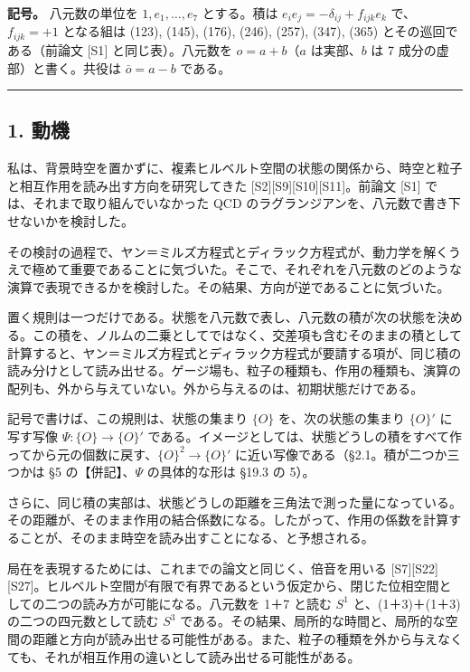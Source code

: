 \documentclass[
  a4paper,
]{ltjsarticle}
\begin{document}
\textbf{記号。} 八元数の単位を \(1, e_1, \dots, e_7\) とする。積は
\(e_ie_j = -\delta_{ij} + f_{ijk}e_k\) で、\(f_{ijk} = +1\) となる組は
(123), (145), (176), (246), (257), (347), (365) とその巡回である（前論文
{[}S1{]} と同じ表）。八元数を \(o = a + b\)（\(a\) は実部、\(b\) は 7
成分の虚部）と書く。共役は \(\bar o = a - b\) である。

\begin{center}\rule{0.5\linewidth}{0.5pt}\end{center}

\subsection{1. 動機}\label{ux52d5ux6a5f}

私は、背景時空を置かずに、複素ヒルベルト空間の状態の関係から、時空と粒子と相互作用を読み出す方向を研究してきた
{[}S2{]}{[}S9{]}{[}S10{]}{[}S11{]}。前論文 {[}S1{]}
では、それまで取り組んでいなかった QCD
のラグランジアンを、八元数で書き下せないかを検討した。

その検討の過程で、ヤン＝ミルズ方程式とディラック方程式が、動力学を解くうえで極めて重要であることに気づいた。そこで、それぞれを八元数のどのような演算で表現できるかを検討した。その結果、方向が逆であることに気づいた。

置く規則は一つだけである。状態を八元数で表し、八元数の積が次の状態を決める。この積を、ノルムの二乗としてではなく、交差項も含むそのままの積として計算すると、ヤン＝ミルズ方程式とディラック方程式が要請する項が、同じ積の読み分けとして読み出せる。ゲージ場も、粒子の種類も、作用の種類も、演算の配列も、外から与えていない。外から与えるのは、初期状態だけである。

記号で書けば、この規則は、状態の集まり \(\{O\}\) を、次の状態の集まり
\(\{O\}'\) に写す写像 \(\Psi : \{O\} \to \{O\}'\)
である。イメージとしては、状態どうしの積をすべて作ってから元の個数に戻す、\(\{O\}^2 \to \{O\}'\)
に近い写像である（§2.1。積が二つか三つかは §5 の【併記】、\(\Psi\)
の具体的な形は §19.3 の 5）。

さらに、同じ積の実部は、状態どうしの距離を三角法で測った量になっている。その距離が、そのまま作用の結合係数になる。したがって、作用の係数を計算することが、そのまま時空を読み出すことになる、と予想される。

局在を表現するためには、これまでの論文と同じく、倍音を用いる
{[}S7{]}{[}S22{]}{[}S27{]}。ヒルベルト空間が有限で有界であるという仮定から、閉じた位相空間としての二つの読み方が可能になる。八元数を
1＋7 と読む \(S^1\) と、(1＋3)＋(1＋3) の二つの四元数として読む \(S^3\)
である。その結果、局所的な時間と、局所的な空間の距離と方向が読み出せる可能性がある。また、粒子の種類を外から与えなくても、それが相互作用の違いとして読み出せる可能性がある。
\end{document}
